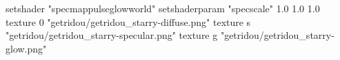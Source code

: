 setshader "specmappulseglowworld"
setshaderparam "specscale" 1.0 1.0 1.0
texture 0 "getridou/getridou_starry-diffuse.png"
texture s "getridou/getridou_starry-specular.png"
texture g "getridou/getridou_starry-glow.png"
